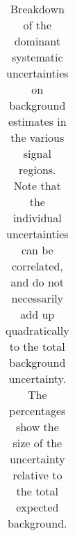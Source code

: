 \begin{table}
\begin{tabular*}{\textwidth}{@{\extracolsep{\fill}}lcccc}
\bottomrule
\end{tabular*}
\caption{Breakdown of the dominant systematic uncertainties on background estimates in the various signal regions.
Note that the individual uncertainties can be correlated, and do not necessarily add up quadratically to
the total background uncertainty. The percentages show the size of the uncertainty relative to the total expected background.}
\label{table.results.bkgestimate.uncertainties.CR_SR}
\end{table}